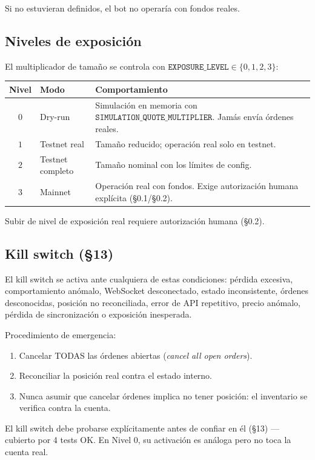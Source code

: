 \documentclass[11pt,a4paper]{article}
\newcommand{\codigo}[1]{\texttt{#1}}
\begin{document}
Si no estuvieran definidos, el bot no operaría con fondos reales.

\subsection{Niveles de exposición}
El multiplicador de tamaño se controla con
$\codigo{EXPOSURE\_LEVEL} \in \{0,1,2,3\}$:

\begin{center}
\begin{longtable}{cll}
\toprule
\textbf{Nivel} & \textbf{Modo} & \textbf{Comportamiento} \\
\midrule
\endhead
$0$ & Dry-run & Simulación en memoria con
$\codigo{SIMULATION\_QUOTE\_MULTIPLIER}$. Jamás envía órdenes reales. \\
$1$ & Testnet real & Tamaño reducido; operación real solo en testnet. \\
$2$ & Testnet completo & Tamaño nominal con los límites de config. \\
$3$ & Mainnet & Operación real con fondos. Exige autorización humana explícita (§0.1/§0.2). \\
\bottomrule
\end{longtable}
\end{center}

Subir de nivel de exposición real requiere autorización humana (§0.2).

\subsection{Kill switch (§13)}
El kill switch se activa ante cualquiera de estas condiciones:
pérdida excesiva, comportamiento anómalo, WebSocket desconectado, estado
inconsistente, órdenes desconocidas, posición no reconciliada, error de
API repetitivo, precio anómalo, pérdida de sincronización o exposición
inesperada.

Procedimiento de emergencia:
\begin{enumerate}
  \item Cancelar TODAS las órdenes abiertas
  (\emph{cancel all open orders}).
  \item Reconciliar la posición real contra el estado interno.
  \item Nunca asumir que cancelar órdenes implica no tener posición:
  el inventario se verifica contra la cuenta.
\end{enumerate}

El kill switch debe probarse explícitamente antes de confiar en él
(§13) — cubierto por 4 tests OK. En Nivel 0, su activación es análoga
pero no toca la cuenta real.
\end{document}
